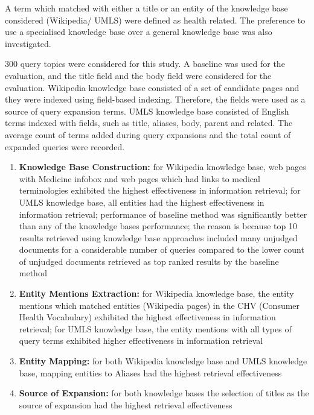 \documentclass[]{article}
\begin{document}
\begin{enumerate}
\begin{enumerate}
\end{enumerate}

A term which matched with either a title or an entity of the knowledge base considered (Wikipedia/ UMLS) were defined as health related. The preference to use a specialised knowledge base over a general knowledge base was also investigated. 

300 query topics were considered for this study. A baseline was used for the evaluation, and the title field and the body field were considered for the evaluation. Wikipedia knowledge base consisted of a set of candidate pages and they were indexed using field-based indexing. Therefore, the fields were used as a source of query expansion terms. UMLS knowledge base consisted of English terms indexed with fields, such as title, aliases, body, parent and related. The average count of terms added during query expansions and the total count of expanded queries were recorded.

\begin{enumerate}
	\item \textbf{Knowledge Base Construction:} for Wikipedia knowledge base, web pages with Medicine infobox and web pages which had links to medical terminologies exhibited the highest effectiveness in information retrieval; for UMLS knowledge base, all entities had the highest effectiveness in information retrieval; performance of baseline method was significantly better than any of the knowledge base\textquotesingle s performance; the reason is because top 10 results retrieved using knowledge base approaches included many unjudged documents for a considerable number of queries compared to the lower count of unjudged documents retrieved as top ranked results by the baseline method 
	
	\item \textbf{Entity Mentions Extraction:} for Wikipedia knowledge base, the entity mentions which matched entities (Wikipedia pages) in the CHV (Consumer Health Vocabulary) exhibited the highest effectiveness in information retrieval; for UMLS knowledge base, the entity mentions with all types of query terms exhibited higher effectiveness in information retrieval
	
	\item \textbf{Entity Mapping:} for both Wikipedia knowledge base and UMLS knowledge base, mapping entities to Aliases had the highest retrieval effectiveness
	
	\item \textbf{Source of Expansion:} for both knowledge bases the selection of titles as the source of expansion had the highest retrieval effectiveness
	

\end{enumerate}
\end{enumerate}
\end{document}
